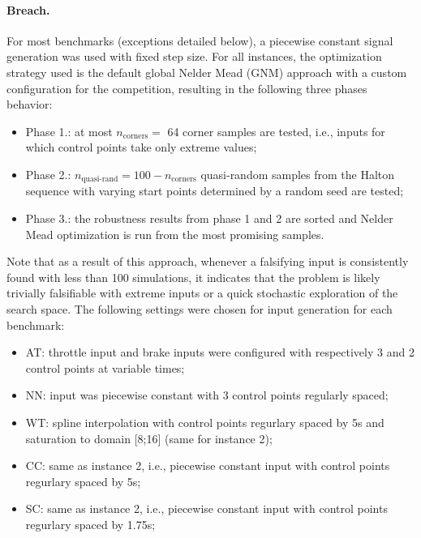 \documentclass[a4paper]{easychair}
\newcommand{\Breach}{Breach\xspace}
\begin{document}
    \paragraph{\Breach.} For most benchmarks (exceptions detailed below), a
    piecewise constant signal generation was used with fixed step
    size. For all instances, the optimization strategy used is the
    default global Nelder Mead (GNM) approach with a custom
    configuration for the competition, resulting in the following
    three phases behavior:
    \begin{itemize}[noitemsep,topsep=0pt,parsep=0pt,partopsep=0pt]
    \item Phase 1.: at most $n_{\text{corners}}= $ 64 corner samples are tested, i.e., inputs
      for which control points take only extreme values;
    \item Phase 2.: $n_{\text{quasi-rand}} = 100-n_{\text{corners}}$
      quasi-random samples from the Halton sequence with
      varying start points determined by a random seed are tested;
    \item Phase 3.: the robustness results from phase 1 and 2 are
      sorted and Nelder Mead optimization is run from the most
      promising samples.
    \end{itemize}
    Note that as a result of this approach, whenever a falsifying
    input is consistently found with less than 100 simulations, it
    indicates that the problem is likely trivially falsifiable with
    extreme inputs or a quick stochastic exploration of the search
    space. The following settings were chosen for input generation
    for each benchmark:
    \begin{itemize}[noitemsep,topsep=0pt,parsep=0pt,partopsep=0pt]
    \item AT: throttle input and brake inputs were configured
      with respectively 3 and 2 control points at variable times;
    \item NN: input was piecewise constant with 3 control
      points regularly spaced;
    \item WT: spline interpolation with control
      points regurlary spaced by 5s and saturation to domain [8;16]
      (same for instance 2);
    \item CC: same as instance 2, i.e., piecewise constant input with control
      points regurlary spaced by 5s;
    \item SC: same as instance 2, i.e., piecewise constant input with control
      points regurlary spaced by 1.75s;
    \end{itemize}
\end{document}
